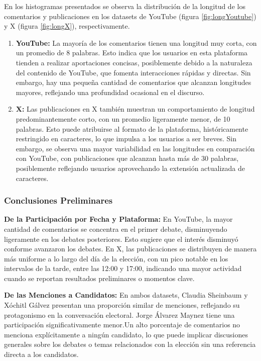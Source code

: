 \documentclass[10pt, a4paper]{article}
\begin{document}
	
	En los histogramas presentados se observa la distribución de la longitud de los comentarios y publicaciones en los datasets de YouTube (figura \ref{fig:longYoutube}) y X (figura \ref{fig:longX}), respectivamente.
	
	\begin{enumerate}
		\item \textbf{YouTube:} La mayoría de los comentarios tienen una longitud muy corta, con un promedio de 8 palabras. Esto indica que los usuarios en esta plataforma tienden a realizar aportaciones concisas, posiblemente debido a la naturaleza del contenido de YouTube, que fomenta interacciones rápidas y directas. Sin embargo, hay una pequeña cantidad de comentarios que alcanzan longitudes mayores, reflejando una profundidad ocasional en el discurso.
		
		\item \textbf{X:} Las publicaciones en X también muestran un comportamiento de longitud predominantemente corto, con un promedio ligeramente menor, de 10 palabras. Esto puede atribuirse al formato de la plataforma, históricamente restringido en caracteres, lo que impulsa a los usuarios a ser breves. Sin embargo, se observa una mayor variabilidad en las longitudes en comparación con YouTube, con publicaciones que alcanzan hasta más de 30 palabras, posiblemente reflejando usuarios aprovechando la extensión actualizada de caracteres.
	\end{enumerate}
	
	\subsubsection{Conclusiones Preliminares}
	\textbf{De la Participación por Fecha y Plataforma:} En YouTube, la mayor cantidad de comentarios se concentra en el primer debate, disminuyendo ligeramente en los debates posteriores. Esto sugiere que el interés disminuyó conforme avanzaron los debates. En X, las publicaciones se distribuyen de manera más uniforme a lo largo del día de la elección, con un pico notable en los intervalos de la tarde, entre las 12:00 y 17:00, indicando una mayor actividad cuando se reportan resultados preliminares o momentos clave.
	
	\textbf{De las Menciones a Candidatos:} En ambos datasets, Claudia Sheinbaum y Xóchitl Gálvez presentan una proporción similar de menciones, reflejando su protagonismo en la conversación electoral. Jorge Álvarez Maynez tiene una participación significativamente menor.Un alto porcentaje de comentarios no menciona explícitamente a ningún candidato, lo que puede implicar discusiones generales sobre los debates o temas relacionados con la elección sin una referencia directa a los candidatos.
	
\end{document}
